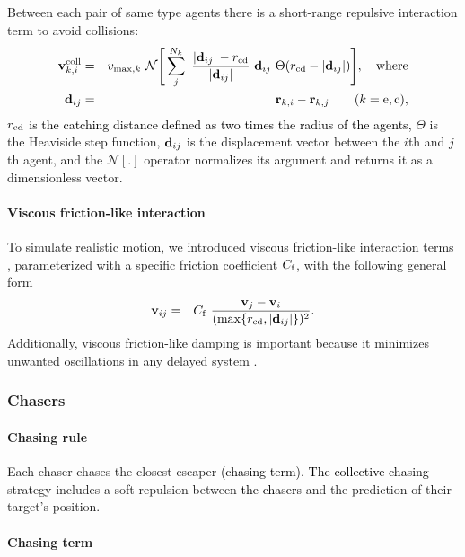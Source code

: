 \documentclass[12pt,a4paper,final]{iopart}
\newcommand{\revision}{\textcolor{black}}
\newcommand{\revisiontwo}{\textcolor{black}}
\begin{document}
Between each pair of same type agents there is a short-range repulsive interaction term to avoid collisions:
\begin{eqnarray} 
{\bf v}_{k,i}^{\rm coll} &=& v_{{\rm max},k} \  \mathcal{N} \Bigg[ \sum_j^{\revision{N_k}} \  \frac{|{\bf d}_{ij}| 
- \revision{{r_{\rm cd}}}}{|{\bf d}_{ij}|} \  {\bf d}_{ij} \  \Theta(\revision{{r_{\rm cd}}}- |{\bf d}_{ij}|) \Bigg], \quad {\rm where} \\
{\bf d}_{ij} &=& {\bf r}_{k, i} - {\bf r}_{k, j} \qquad (k = {\rm e, c}),
\label{eq:rep} 
\end{eqnarray}
\revision{$r_{\rm cd}$ is the catching distance defined as two times the radius of the agents, }  $\Theta$ is the Heaviside step function, ${\bf d}_{ij}$ \revision{is} the displacement vector between the $i$th and $j$th agent, and the $\mathcal{N}[.]$ operator normalizes its argument and returns it as a dimensionless vector.

\paragraph{Viscous friction-like interaction}

To simulate realistic motion, we introduced viscous friction-like interaction terms \cite{cucker2007emergent}, parameterized with a specific friction coefficient $C_{\rm f}$, with the following general form
\begin{eqnarray} 
{\bf v}_{ij} &=& C_{\revisiontwo{\rm f}} \  \frac{{\bf v}_j - {\bf v}_i }{({\rm max}\{\revision{{r_{\rm cd}}}, |{\bf d}_{ij}| \})^2}.  
\label{eq:frrr} 
\end{eqnarray}
Additionally, viscous friction\revision{-like} damping is important because it minimizes unwanted oscillations in any delayed system \cite{viragh2014flocking}.

\subsubsection{Chasers}

\paragraph{Chasing rule} Each chaser chases the closest escaper \revision{(chasing term)}. \revision{The collective chasing} strategy includes a soft repulsion between \revision{the chasers} and the prediction of their target's position.

\paragraph{Chasing  term} 
\end{document}
